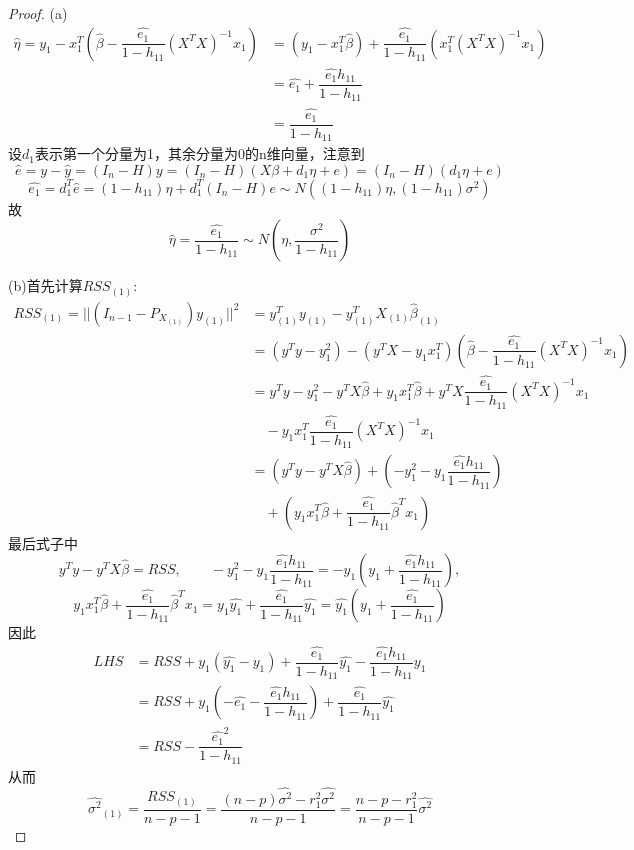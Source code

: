 \documentclass[cn,hazy,green,12pt,normal]{elegantnote}
\numberwithin{equation}{section}
\numberwithin{subsection}{section}
\begin{document}
\begin{proof}
 (a)      
\begin{align*}
    \hat{\eta} = y_1-x_1^T(\hat{\beta}-\dfrac{\hat{e_1}}{1-h_{11}}(X^TX)^{-1}x_1)&=(y_1-x_1^T\hat{\beta})+\dfrac{\hat{e_1}}{1-h_{11}}(x_1^T(X^TX)^{-1}x_1)\\
    &=\hat{e_1}+\dfrac{\hat{e_1}h_{11}}{1-h_{11}}\\
    &=\dfrac{\hat{e_1}}{1-h_{11}}
\end{align*}
设$d_1$表示第一个分量为1，其余分量为0的n维向量，注意到
\[\hat{e}=y-\hat{y}=(I_n-H)y=(I_n-H)(X\beta+d_1\eta+e)=(I_n-H)(d_1\eta+e)\] \[\hat{e_1}=d_1^T\hat{e}=(1-h_{11})\eta+d_1^T(I_n-H)e\sim N((1-h_{11})\eta,(1-h_{11})\sigma^2)\]
故
\[\hat{\eta}=\dfrac{\hat{e_1}}{1-h_{11}} \sim N(\eta,\dfrac{\sigma^2}{1-h_{11}})\]

\noindent (b)首先计算$RSS_{(1)}$:
\begin{align*}
    RSS_{(1)}=||(I_{n-1}-P_{X_{(1)}})y_{(1)}||^2&=y_{(1)}^Ty_{(1)}-y_{(1)}^TX_{(1)}\hat{\beta}_{(1)}\\
    &=(y^Ty-y_1^2)-(y^TX-y_1x_1^T)(\hat{\beta}-\dfrac{\hat{e_1}}{1-h_{11}}(X^TX)^{-1}x_1)\\
    &=y^Ty-y_1^2-y^TX\hat{\beta}+y_1x_1^T\hat{\beta}+y^TX\dfrac{\hat{e_1}}{1-h_{11}}(X^TX)^{-1}x_1\\
    &\quad-y_1x_1^T\dfrac{\hat{e_1}}{1-h_{11}}(X^TX)^{-1}x_1\\
    &=(y^Ty-y^TX\hat{\beta})+(-y_1^2-y_1\dfrac{\hat{e_1}h_{11}}{1-h_{11}})\\
    &\quad +(y_1x_1^T\hat{\beta}+\dfrac{\hat{e_1}}{1-h_{11}}\hat{\beta}^Tx_1)
\end{align*}
最后式子中
\[y^Ty-y^TX\hat{\beta}=RSS,\qquad -y_1^2-y_1\dfrac{\hat{e_1}h_{11}}{1-h_{11}}=-y_1(y_1+\dfrac{\hat{e_1}h_{11}}{1-h_{11}}),\]
\[ y_1x_1^T\hat{\beta}+\dfrac{\hat{e_1}}{1-h_{11}}\hat{\beta}^Tx_1=y_1\hat{y_1}+\dfrac{\hat{e_1}}{1-h_{11}}\hat{y_1}=\hat{y_1}(y_1+\dfrac{\hat{e_1}}{1-h_{11}})\]
因此
\begin{align*}
    LHS&=RSS+y_1(\hat{y_1}-y_1)+\dfrac{\hat{e_1}}{1-h_{11}}\hat{y_1}-\dfrac{\hat{e_1}h_{11}}{1-h_{11}}y_1\\
    &=RSS+y_1(-\hat{e_1}-\dfrac{\hat{e_1}h_{11}}{1-h_{11}})+\dfrac{\hat{e_1}}{1-h_{11}}\hat{y_1}\\
    &=RSS-\dfrac{\hat{e_1}^2}{1-h_{11}}
\end{align*}
从而\[\hat{\sigma^2}_{(1)}=\dfrac{RSS_{(1)}}{n-p-1}=\dfrac{(n-p)\hat{\sigma^2}-r_1^2\hat{\sigma^2}}{n-p-1}=\dfrac{n-p-r_1^2}{n-p-1}\hat{\sigma^2}\]


\end{proof}
\end{document}

